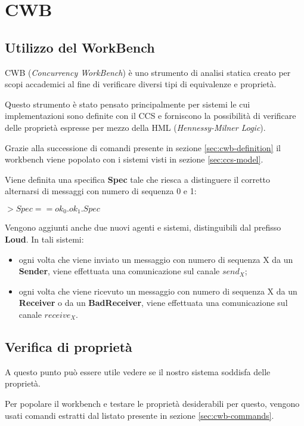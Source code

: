 \newpage{}\section{CWB}

\subsection{Utilizzo del WorkBench}

CWB (\emph{Concurrency WorkBench}) è uno strumento di analisi statica creato
per scopi accademici al fine di verificare diversi tipi di equivalenze e
proprietà.

Questo strumento è stato pensato principalmente per sistemi le cui
implementazioni sono definite con il CCS e forniscono la possibilità di
verificare delle proprietà espresse per mezzo della HML (\emph{Hennessy-Milner
Logic}).

Grazie alla successione di comandi presente in sezione \ref{sec:cwb-definition}
il workbench viene popolato con i sistemi visti in sezione
\ref{sec:ccs-model}.

Viene definita una specifica \textbf{Spec} tale che riesca a distinguere il
corretto alternarsi di messaggi con numero di sequenza 0 e 1:

$ > Spec = = ok_0.ok_1.Spec $

Vengono aggiunti anche due nuovi agenti e sistemi, distinguibili dal prefisso
\textbf{Loud}. In tali sistemi:

\begin{itemize}
  \item ogni volta che viene inviato un messaggio con numero di sequenza X
    da un \textbf{Sender}, viene effettuata una comunicazione sul canale
    \textbf{$send_X$};
  \item ogni volta che viene ricevuto un messaggio con numero di sequenza X
    da un \textbf{Receiver} o da un \textbf{BadReceiver}, viene effettuata una
    comunicazione sul canale \textbf{$receive_X$}.
\end{itemize}

\subsection{Verifica di proprietà}

A questo punto può essere utile vedere se il nostro sistema soddisfa delle
proprietà.

Per popolare il workbench e testare le proprietà desiderabili per questo,
vengono usati comandi estratti dal listato presente in sezione
\ref{sec:cwb-commands}.

